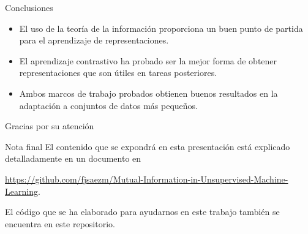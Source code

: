 \documentclass[aspectratio=169]{beamer}
\begin{document}
  


  
  \begin{frame}{Conclusiones}

    \begin{itemize}
      \item El uso de la teoría de la información proporciona un buen punto de partida para el aprendizaje de representaciones.
      \item El aprendizaje contrastivo ha probado ser la mejor forma de obtener representaciones que son útiles en tareas posteriores.
      \item Ambos marcos de trabajo probados obtienen buenos resultados en la adaptación a conjuntos de datos más pequeños.
    \end{itemize}
  \end{frame}
  
  \appendix

  \begin{frame}
    Gracias por su atención
  \end{frame}

  
  \begin{frame}[noframenumbering]{Nota final}
    El contenido que se expondrá en esta presentación está explicado detalladamente en un documento en
    \begin{center}
    \url{https://github.com/fjsaezm/Mutual-Information-in-Unsupervised-Machine-Learning}.
    \end{center}

    El código que se ha elaborado para ayudarnos en este trabajo también se encuentra en este repositorio.
    
  \end{frame}
\end{document}
